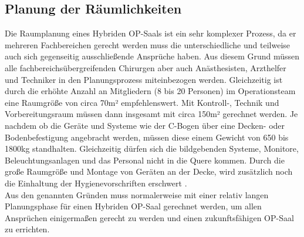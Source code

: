 





\subsection{Planung der Räumlichkeiten}

Die Raumplanung eines Hybriden OP-Saals ist ein sehr komplexer Prozess, da er mehreren Fachbereichen gerecht werden muss die unterschiedliche und teilweise auch sich gegenseitig ausschließende Ansprüche haben. Aus diesem Grund müssen alle fachbereichsübergreifenden Chirurgen aber auch Anästhesisten, Arzthelfer und Techniker in den Planungsprozess miteinbezogen werden.
Gleichzeitig ist durch die erhöhte Anzahl an Mitgliedern (8 bis 20 Personen) im Operationsteam eine Raumgröße von circa 70m² empfehlenswert. Mit Kontroll-, Technik und Vorbereitungsraum müssen dann insgesamt mit circa 150m² gerechnet werden. Je nachdem ob die Geräte und Systeme wie der C-Bogen über eine Decken- oder Bodenbefestigung angebracht werden, müssen diese einem Gewicht von 650 bis 1800kg standhalten. Gleichzeitig dürfen sich die bildgebenden Systeme, Monitore, Beleuchtungsanlagen und das Personal nicht in die Quere kommen. Durch die große Raumgröße und Montage von Geräten an der Decke, wird zusätzlich noch die Einhaltung der Hygienevorschriften erschwert \cite{TechnicalConsiderations}.\\
Aus den genannten Gründen muss normalerweise mit einer relativ langen Planungsphase für einen Hybriden OP-Saal gerechnet werden, um allen Ansprüchen einigermaßen gerecht zu werden und einen zukunftsfähigen OP-Saal zu errichten.



 





